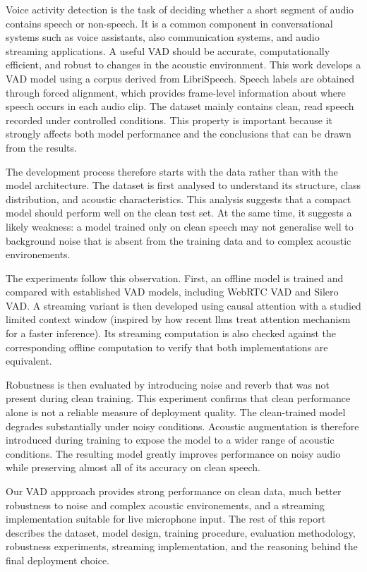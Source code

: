 \documentclass{article}
\begin{document}
Voice activity detection is the task of deciding whether a short segment of audio contains speech or non-speech. It is a common component in conversational systems such as voice assistants, also communication systems, and audio streaming applications. A useful VAD should be accurate, computationally efficient, and robust to changes in the acoustic environment.
This work develops a VAD model using a corpus derived from LibriSpeech. Speech labels are obtained through forced alignment, which provides frame-level information about where speech occurs in each audio clip. The dataset mainly contains clean, read speech recorded under controlled conditions. This property is important because it strongly affects both model performance and the conclusions that can be drawn from the results.

The development process therefore starts with the data rather than with the model architecture. The dataset is first analysed to understand its structure, class distribution, and acoustic characteristics. This analysis suggests that a compact model should perform well on the clean test set. At the same time, it suggests a likely weakness: a model trained only on clean speech may not generalise well to background noise that is absent from the training data and to complex acoustic environements. 

The experiments follow this observation. First, an offline model is trained and compared with established VAD models, including WebRTC VAD and Silero VAD. A streaming variant is then developed using causal attention with a studied limited context window (inspired by how recent llms treat attention mechanism for a faster inference). Its streaming computation is also checked against the corresponding offline computation to verify that both implementations are equivalent.

Robustness is then evaluated by introducing noise and reverb that was not present during clean training. This experiment confirms that clean performance alone is not a reliable measure of deployment quality. The clean-trained model degrades substantially under noisy conditions. Acoustic augmentation is therefore introduced during training to expose the model to a wider range of acoustic conditions. The resulting model greatly improves performance on noisy audio while preserving almost all of its accuracy on clean speech.
 

Our VAD appproach provides strong performance on clean data, much better robustness to noise and complex acoustic environements, and a streaming implementation suitable for live microphone input. The rest of this report describes the dataset, model design, training procedure, evaluation methodology, robustness experiments, streaming implementation, and the reasoning behind the final deployment choice.
\end{document}
